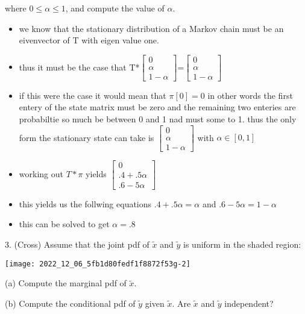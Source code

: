 \documentclass[10pt]{article}
\begin{document}
where $0 \leq \alpha \leq 1$, and compute the value of $\alpha$. 
\begin{itemize}
    \item we know that the stationary distribution of a Markov chain must be an eivenvector of T with eigen value one.
    \item thus it must be the case that T*$
\left[\begin{array}{c}
0 \\
\alpha \\
1-\alpha
\end{array}\right]
$=$
\left[\begin{array}{c}
0 \\
\alpha \\
1-\alpha
\end{array}\right]
$\item if this were the case it would mean that $\pi[0]=0$ in other words the first entery of the state matrix must be zero and the remaining two enteries are probabiltie so much be between 0 and 1 nad must some to 1. thus the only form the stationary state can take is $
\left[\begin{array}{c}
0 \\
\alpha \\
1-\alpha
\end{array}\right]
$ with $\alpha\in[0,1]$
\item working out $T*\pi$ yields $
\left[\begin{array}{c}
0 \\
.4+.5\alpha \\
.6-5\alpha
\end{array}\right]
$ \item this yields us the follwing equations $.4+.5\alpha =\alpha$ and $.6-5\alpha=1-\alpha$
\item this can be solved to get $\alpha=.8$

\end{itemize}


3. (Cross) Assume that the joint pdf of $\tilde{x}$ and $\tilde{y}$ is uniform in the shaded region:

\begin{center}
\texttt{[image: 2022\_12\_06\_5fb1d80fedf1f8872f53g-2]}
\end{center}

(a) Compute the marginal pdf of $\tilde{x}$.

(b) Compute the conditional pdf of $\tilde{y}$ given $\tilde{x}$. Are $\tilde{x}$ and $\tilde{y}$ independent?
\end{document}
